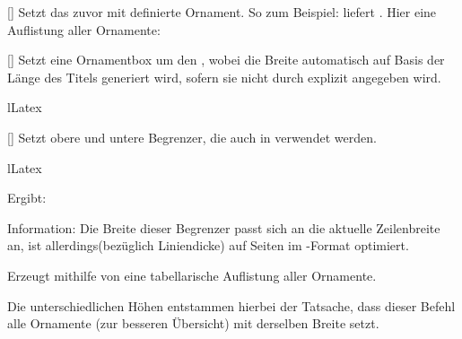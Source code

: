 %
%
%

[]
Setzt das zuvor mit  definierte Ornament. So zum Beispiel:  liefert \ornalion.
Hier eine Auflistung aller Ornamente:
\getRegisteredOrnaments%
\expandafter\typesetList[T]{\lillyxlist}

%
%
%

[]
Setzt eine Ornamentbox um den , wobei die Breite automatisch auf Basis der Länge des Titels generiert wird, sofern sie nicht durch  explizit angegeben wird.
\iflillycompact%
\begin{latex}
    \begin{center}
    \end{center}
\end{latex}
\else%
\begin{defaultlst}[][listing side text,righthand width=7cm]{lLatex}
\begin{center}
\end{center}
\end{defaultlst}
\fi%

%
%
%

[\secline{}\cmdlist{}]
Setzt obere und untere Begrenzer, die auch in  verwendet werden.
\begin{defaultlst}{lLatex}

\end{defaultlst}
\iflillycompact\else Ergibt:\\

\fi
Information: Die Breite dieser Begrenzer passt sich an die aktuelle Zeilenbreite an, ist allerdings(bezüglich Liniendicke) auf Seiten im -Format optimiert.

%
%
%

Erzeugt mithilfe von  eine tabellarische Auflistung aller Ornamente.
\begin{example}
    \begin{tcbraster}[raster columns=4, blankest, graphics pages={1,2,6}, colback=white]
    \end{tcbraster}
\end{example}
Die unterschiedlichen Höhen entstammen hierbei der Tatsache, dass dieser Befehl alle Ornamente (zur besseren Übersicht) mit derselben Breite setzt.

